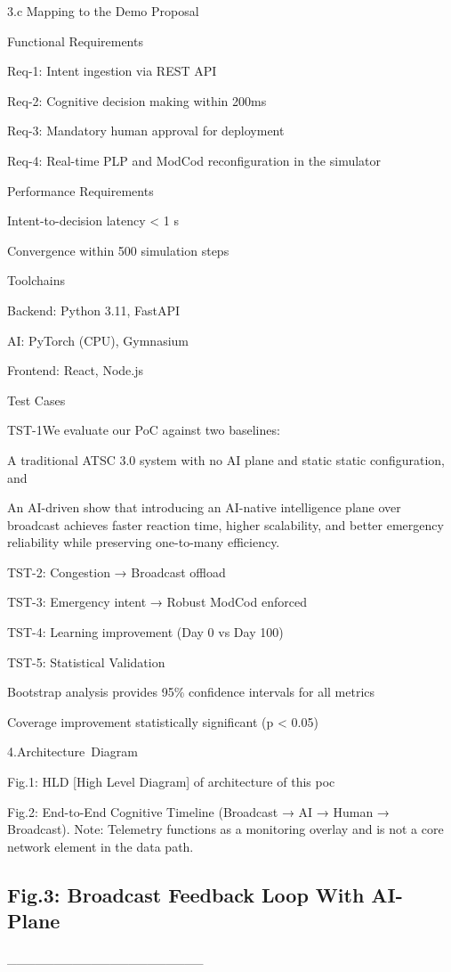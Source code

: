 \documentclass{article}
\begin{document}
3.c Mapping to the Demo Proposal

Functional Requirements

Req-1: Intent ingestion via REST API

Req-2: Cognitive decision making within 200ms

Req-3: Mandatory human approval for deployment

Req-4: Real-time PLP and ModCod reconfiguration in the simulator

Performance Requirements

Intent-to-decision latency < 1 s

Convergence within 500 simulation steps

Toolchains

Backend: Python 3.11, FastAPI

AI: PyTorch (CPU), Gymnasium

Frontend: React, Node.js

Test Cases

TST-1We evaluate our PoC against two baselines:

A traditional ATSC 3.0 system with no AI plane and static static configuration, and

An AI-driven show that introducing an AI-native intelligence plane over broadcast achieves faster reaction time, higher scalability, and better emergency reliability while preserving one-to-many efficiency.

TST-2: Congestion → Broadcast offload

TST-3: Emergency intent → Robust ModCod enforced

TST-4: Learning improvement (Day 0 vs Day 100)

TST-5: Statistical Validation

Bootstrap analysis provides 95\% confidence intervals for all metrics

Coverage improvement statistically significant (p < 0.05)

4.Architecture Diagram

Fig.1: HLD [High Level Diagram] of architecture of this poc

Fig.2: End-to-End Cognitive Timeline (Broadcast → AI → Human → Broadcast). Note: Telemetry functions as a monitoring overlay and is not a core network element in the data path.

\subsection{Fig.3:  Broadcast Feedback Loop With AI-Plane}
\_\_\_\_\_\_\_\_\_\_\_\_\_\_\_\_\_\_\_\_\_
\end{document}
